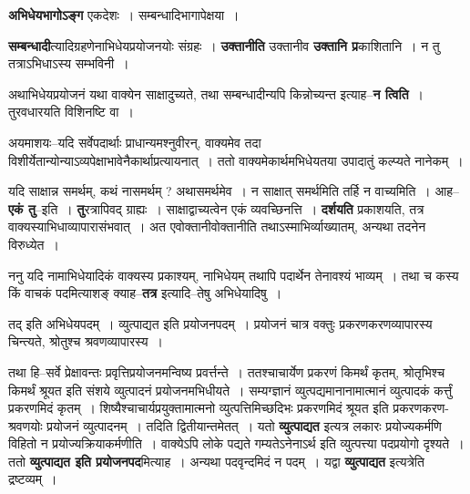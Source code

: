 \documentclass[article,12pt,a4paper]{memoir}
\begin{document}
	  \pstart \textbf{अभिधेयभागोऽङ्ग} एकदेशः । सम्बन्धादिभागापेक्षया ।
	\pend
      

	  \pstart \textbf{सम्बन्धादी}त्यादिग्रहणेनाभिधेयप्रयोजनयोः संग्रहः । \leavevmode{} \textbf{उक्तानीति} उक्तानीव \textbf{उक्तानि प्र}काशितानि । न तु तत्राऽभिधाऽस्य सम्भविनी ।
	\pend
      

	  \pstart अथाभिधेयप्रयोजनं यथा वाक्येन साक्षादुच्यते, तथा सम्बन्धादीन्यपि किन्नोच्यन्त इत्याह--\textbf{न त्विति} । तुरवधारयति विशिनष्टि वा ।
	\pend
      

	  \pstart अयमाशयः--यदि सर्वेपदार्थाः प्राधान्यमश्नुवीरन्, वाक्यमेव तदा विशीर्येतान्योन्याऽव्यपेक्षाभावेनैकार्थाप्रत्यायनात् । ततो वाक्यमेकार्थमभिधेयतया उपादातुं कल्प्यते नानेकम् ।
	\pend
      

	  \pstart यदि साक्षान्न समर्थम्, कथं नासमर्थम् ? अथासमर्थमेव । न साक्षात् समर्थमिति तर्हि न वाच्यमिति । आह--\textbf{एकं तु}--इति । \textbf{तु}रत्रापिवद् ग्राह्यः । साक्षाद्वाच्यत्वेन एकं व्यवच्छिनत्ति । \textbf{दर्शयति} प्रकाशयति, तत्र वाक्यस्याभिधाव्यापारासंभवात् । अत एवोक्तानीवोक्तानीति तथाऽस्माभिर्व्याख्यातम्, अन्यथा तदनेन विरुध्येत ।
	\pend
      

	  \pstart ननु यदि नामाभिधेयादिकं वाक्यस्य प्रकाश्यम्, नाभिधेयम् तथापि पदार्थेन तेनावश्यं भाव्यम् । तथा च कस्य किं वाचकं पदमित्याशङ् क्याह--\textbf{तत्र} इत्यादि--तेषु अभिधेयादिषु ।  \leavevmode{} 
	  
	तद् इति अभिधेयपदम् । व्युत्पाद्यत इति प्रयोजनपदम् । प्रयोजनं चात्र वक्तुः प्रकरणकरणव्यापारस्य चिन्त्यते, श्रोतुश्च श्रवणव्यापारस्य ।  
	  
	तथा हि--सर्वे प्रेक्षावन्तः प्रवृत्तिप्रयोजनमन्विष्य प्रवर्त्तन्ते । ततश्चाचार्येण प्रकरणं किमर्थं कृतम्, श्रोतृभिश्च किमर्थं श्रूयत इति संशये व्युत्पादनं प्रयोजनमभिधीयते । सम्यग्ज्ञानं व्युत्पद्यमानानामात्मानं व्युत्पादकं कर्त्तुं प्रकरणमिदं कृतम् । शिष्यैश्चाचार्यप्रयुक्तामात्मनो व्युत्पत्तिमिच्छदिभः प्रकरणमिदं श्रूयत इति प्रकरणकरण-श्रवणयोः प्रयोजनं व्युत्पादनम् । तदिति द्वितीयान्तमेतत् । यतो \textbf{व्युत्पाद्यत} इत्यत्र लकारः प्रयोज्यकर्मणि विहितो न प्रयोज्यक्रियाकर्मणीति । वाक्येऽपि लोके पद्यते गम्यतेऽनेनाऽर्थ इति व्युत्पत्त्या पदप्रयोगो दृश्यते । ततो \textbf{व्युत्पाद्यत इति प्रयोजनपद}मित्याह । अन्यथा पदवृन्दमिदं न पदम् । यद्वा \textbf{व्युत्पाद्यत} इत्यत्रेति द्रष्टव्यम् ।
	\pend
      
\end{document}

